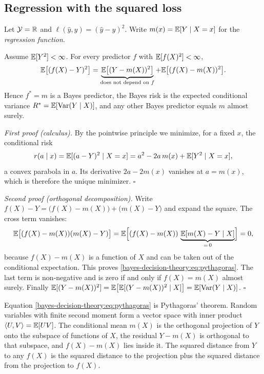 \begin{notechapter}
\section{Regression with the squared loss}\label{bayes-decision-theory:sec:squared}

Let $\mathcal{Y} = \mathbb{R}$ and $\ell(\hat y, y) = (\hat y - y)^2$. Write
$m(x) = \mathbb{E}[Y \mid X = x]$ for the \emph{regression function}.

\begin{theorem}\label{bayes-decision-theory:thm:mse}
Assume $\mathbb{E}[Y^2] < \infty$. For every predictor $f$ with $\mathbb{E}[f(X)^2]<\infty$,
\begin{equation}\label{bayes-decision-theory:eq:pythagoras}
  \mathbb{E}\bigl[(f(X) - Y)^2\bigr]
  = \underbrace{\mathbb{E}\bigl[(Y - m(X))^2\bigr]}_{\text{does not depend on } f}
  + \mathbb{E}\bigl[(f(X) - m(X))^2\bigr].
\end{equation}
Hence $f^* = m$ is a Bayes predictor, the Bayes risk is the expected
conditional variance $R^* = \mathbb{E}[\operatorname{Var}(Y\mid X)]$, and any other Bayes predictor
equals $m$ almost surely.
\end{theorem}

\emph{First proof (calculus).} By the pointwise principle we minimize, for a
fixed $x$, the conditional risk
\[
  r(a\mid x) = \mathbb{E}[(a - Y)^2 \mid X = x] = a^2 - 2a\,m(x) + \mathbb{E}[Y^2\mid X=x],
\]
a convex parabola in $a$. Its derivative $2a - 2m(x)$ vanishes at
$a = m(x)$, which is therefore the unique minimizer.
\hfill$\square$

\emph{Second proof (orthogonal decomposition).} Write
$f(X) - Y = \bigl(f(X) - m(X)\bigr) + \bigl(m(X) - Y\bigr)$ and expand the
square. The cross term vanishes:
\[
  \mathbb{E}\bigl[(f(X) - m(X))(m(X) - Y)\bigr]
  = \mathbb{E}\Bigl[(f(X) - m(X))\,\underbrace{\mathbb{E}[m(X) - Y \mid X]}_{=\,0}\Bigr] = 0,
\]
because $f(X) - m(X)$ is a function of $X$ and can be taken out of the
conditional expectation. This proves \eqref{bayes-decision-theory:eq:pythagoras}.
The last term is non-negative and is zero if and only if $f(X) = m(X)$ almost
surely. Finally $\mathbb{E}[(Y-m(X))^2] = \mathbb{E}\bigl[\mathbb{E}[(Y-m(X))^2\mid X]\bigr] =
\mathbb{E}[\operatorname{Var}(Y\mid X)]$.
\hfill$\square$

\begin{intuition}
Equation \eqref{bayes-decision-theory:eq:pythagoras} is Pythagoras' theorem.
Random variables with finite second moment form a vector space with inner
product $\left\langle U, V \right\rangle = \mathbb{E}[UV]$. The conditional mean $m(X)$ is the orthogonal
projection of $Y$ onto the subspace of functions of $X$, the residual
$Y - m(X)$ is orthogonal to that subspace, and $f(X) - m(X)$ lies inside it.
The squared distance from $Y$ to any $f(X)$ is the squared distance to the
projection plus the squared distance from the projection to $f(X)$.
\end{intuition}


\end{notechapter}

